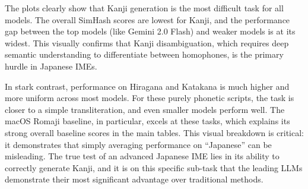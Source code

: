 \documentclass[10pt, a4paper]{article}
\begin{document}
The plots clearly show that Kanji generation is the most difficult task for all models. The overall SimHash scores are lowest for Kanji, and the performance gap between the top models (like Gemini 2.0 Flash) and weaker models is at its widest. This visually confirms that Kanji disambiguation, which requires deep semantic understanding to differentiate between homophones, is the primary hurdle in Japanese IMEs.

In stark contrast, performance on Hiragana and Katakana is much higher and more uniform across most models. For these purely phonetic scripts, the task is closer to a simple transliteration, and even smaller models perform well. The macOS Romaji baseline, in particular, excels at these tasks, which explains its strong overall baseline scores in the main tables. This visual breakdown is critical: it demonstrates that simply averaging performance on ``Japanese'' can be misleading. The true test of an advanced Japanese IME lies in its ability to correctly generate Kanji, and it is on this specific sub-task that the leading LLMs demonstrate their most significant advantage over traditional methods.
\end{document}

